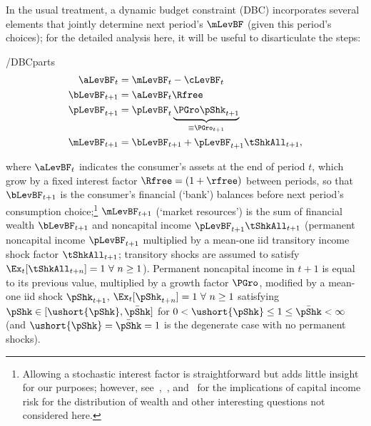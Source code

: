\documentclass[BufferStockTheory]{subfiles}
\begin{document}
In the usual treatment, a dynamic budget constraint (DBC) incorporates
several elements that jointly determine next period's $\mLevBF$ (given this
period's choices); for the detailed analysis here, it will be useful to
disarticulate the steps:\hypertarget{DBCParts}{}
\begin{verbatimwrite}{\EqDir/DBCparts}
  \begin{align}
    \aLevBF_{t}    & = \mLevBF_{t}-\cLevBF_{t}  \label{eq:DBCparts} \\
    \bLevBF_{t+1}    & = \aLevBF_{t} \Rfree \notag \\
    \pLevBF_{t+1}  & = \pLevBF_{t} \underbrace{\PGro\pShk_{t+1}}_{\equiv \PGro_{t+1}}  \notag \\
    \mLevBF_{t+1}  & =  \bLevBF_{t+1} +\pLevBF_{t+1}\tShkAll_{t+1},  \notag
  \end{align}
\end{verbatimwrite}

where $\aLevBF_{t}$ indicates the consumer's assets at the end of period $t$, which grow by a fixed interest factor $\Rfree =(1+\rfree)$ between periods,  so that $\bLevBF_{t+1}$ is the consumer's financial (`bank') balances before next period's consumption choice;\footnote{Allowing a stochastic interest factor is straightforward but adds little insight for our purposes; however, see~\cite{benhabibWealth},~\cite{maTodaRich}, and~\cite{mstIncFluct} for the implications of capital income risk for the distribution of wealth and other interesting questions not considered here.} $\mLevBF_{t+1}$ (`market resources') is the sum of financial wealth $\bLevBF_{t+1}$ and noncapital income $\pLevBF_{t+1}\tShkAll_{t+1}$ (permanent noncapital income $\pLevBF_{t+1}$ multiplied by a mean-one iid transitory income shock factor $\tShkAll_{t+1}$; transitory shocks are assumed to satisfy $\Ex_{t}[{\tShkAll}_{t+n}]=1~\forall~n\geq 1$). Permanent noncapital income in $t+1$ is equal to its previous value, multiplied by a growth factor $\PGro$, modified by a mean-one iid shock $\pShk_{t+1}$, $\Ex_{t}[{\pShk}_{t+n}]=1~\forall~n \geq 1$ satisfying $\pShk \in [\ushort{\pShk},\bar{\pShk}]$ for $0 < \ushort{\pShk} \leq 1 \leq \bar{\pShk} < \infty$ (and $\ushort{\pShk}=\bar{\pShk}=1$ is the degenerate case with no permanent shocks).
\end{document}
